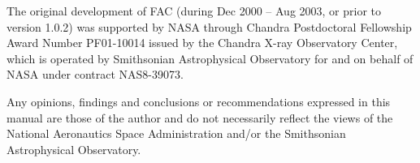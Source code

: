 The original development of FAC (during Dec 2000 -- Aug 2003, or prior
to version 1.0.2) was
supported by NASA through Chandra Postdoctoral Fellowship Award Number
PF01-10014 issued by the Chandra X-ray Observatory Center, which is operated
by Smithsonian Astrophysical Observatory for and on behalf of NASA under
contract NAS8-39073. 

Any opinions, findings and conclusions or
recommendations expressed in this manual are those of the author and do not
necessarily reflect the views of the National Aeronautics Space
Administration and/or the Smithsonian Astrophysical Observatory.
